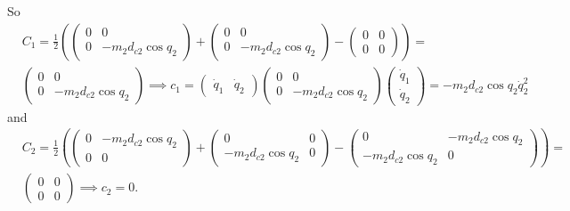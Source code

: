 \documentclass[10pt, a4paper]{report}
\begin{document}
So\begin{align}
    &C_1=\frac{1}{2}\left(
        \begin{pmatrix}
        0&0\\  
        0&-m_2d_{c2}\cos q_2
    \end{pmatrix}+\begin{pmatrix}
        0&0\\  
        0&-m_2d_{c2}\cos q_2
    \end{pmatrix}-\begin{pmatrix}
        0&0\\  
        0&0
    \end{pmatrix}
    \right)=\\ &\begin{pmatrix}
        0&0\\  
        0&-m_2d_{c2}\cos q_2
    \end{pmatrix}\implies  
    c_1=
    \begin{pmatrix}
       \dot  q_1&\dot q_2
    \end{pmatrix}\begin{pmatrix}
        0&0\\  
        0&-m_2d_{c2}\cos q_2
    \end{pmatrix}\begin{pmatrix}
       \dot  q_1\\\dot q_2
    \end{pmatrix}=-m_2d_{c2}\cos q_2\dot q_2^2
\end{align}
and\begin{align}
    &C_2=\frac{1}{2}\left(
        \begin{pmatrix}
        0&-m_2d_{c2}\cos q_2\\  
        0&0
    \end{pmatrix}+\begin{pmatrix}
        0&0\\  
        -m_2d_{c2}\cos q_2&0
    \end{pmatrix}-\begin{pmatrix}
        0 & -m_2d_{c2}\cos q_2\\ 
       -m_2d_{c2}\cos q_2& 0
    \end{pmatrix}
    \right)=\\
    & \begin{pmatrix}
        0&0\\  
        0&0
    \end{pmatrix}\implies c_2=0.
\end{align}
\end{document}
